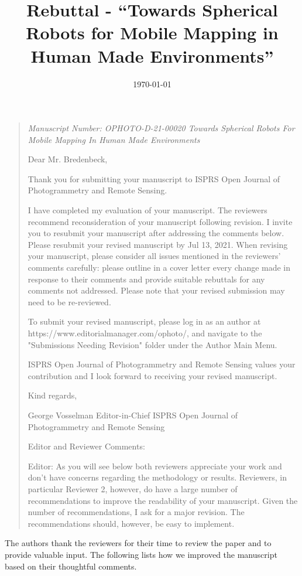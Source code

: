 \documentclass{article}
\title{Rebuttal - ``Towards Spherical Robots for Mobile Mapping in Human Made Environments''}
\date{\today}
\newenvironment{itquote}
  {\begin{quote}\itshape}
  {\end{quote}\ignorespacesafterend}
\begin{document}
\maketitle

\begin{itquote}
Manuscript Number: OPHOTO-D-21-00020 
Towards Spherical Robots For Mobile Mapping In Human Made
Environments

Dear Mr. Bredenbeck, 
 
Thank you for submitting your manuscript to ISPRS Open Journal of
Photogrammetry and Remote Sensing.
 
I have completed my evaluation of your manuscript. The reviewers
recommend reconsideration of your manuscript following revision. I
invite you to resubmit your manuscript after addressing the comments
below. Please resubmit your revised manuscript by Jul 13, 2021. 
When revising your manuscript, please consider all issues mentioned
in the reviewers' comments carefully: please outline in a cover
letter every change made in response to their comments and provide
suitable rebuttals for any comments not addressed. Please note that
your revised submission may need to be re-reviewed.
 
To submit your revised manuscript, please log in as an author at
https://www.editorialmanager.com/ophoto/, and navigate to the
"Submissions Needing Revision" folder under the Author Main Menu.
 
ISPRS Open Journal of Photogrammetry and Remote Sensing values your
contribution and I look forward to receiving your revised
manuscript.
 
Kind regards, 
 
George Vosselman 
Editor-in-Chief 
ISPRS Open Journal of Photogrammetry and Remote Sensing 
  
Editor and Reviewer Comments:
 
Editor:
As you will see below both reviewers appreciate your work and don't
have concerns regarding the methodology or results. Reviewers, in
particular Reviewer 2, however, do have a large number of
recommendations to improve the readability of your manuscript. Given
the number of recommendations, I ask for a major revision. The
recommendations should, however, be easy to implement.
\end{itquote}

The authors thank the reviewers for their time to review the paper and to
provide valuable input. The following lists how we improved the manuscript based
on their thoughtful comments.
\end{document}
